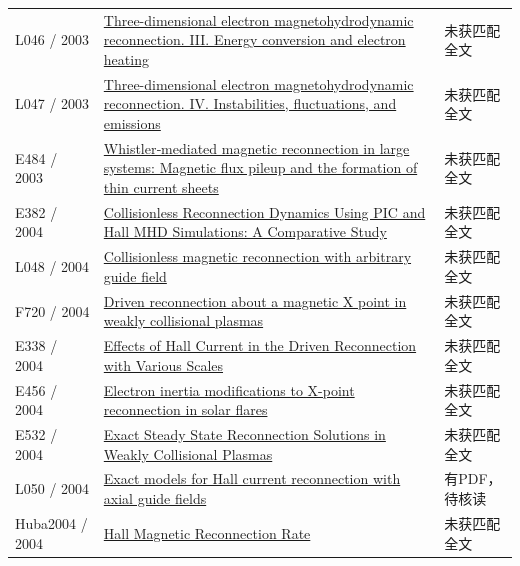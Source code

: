 \begin{longtable}{P{24mm}P{97mm}P{27mm}}
L046 / 2003 & \href{https://doi.org/10.1063/1.1579000}{Three-dimensional electron magnetohydrodynamic reconnection. III. Energy conversion and electron heating} & 未获匹配全文\\

L047 / 2003 & \href{https://doi.org/10.1063/1.1579001}{Three-dimensional electron magnetohydrodynamic reconnection. IV. Instabilities,  fluctuations,  and emissions} & 未获匹配全文\\

E484 / 2003 & \href{https://doi.org/10.1029/2001ja009180}{Whistler‐mediated magnetic reconnection in large systems: Magnetic flux pileup and the formation of thin current sheets} & 未获匹配全文\\

E382 / 2004 & \href{https://ui.adsabs.harvard.edu/abs/2004APS..DPPBP1073B/abstract}{Collisionless Reconnection Dynamics Using PIC and Hall MHD Simulations: A Comparative Study} & 未获匹配全文\\

L048 / 2004 & \href{https://doi.org/10.1063/1.1791640}{Collisionless magnetic reconnection with arbitrary guide field} & 未获匹配全文\\

F720 / 2004 & \href{https://doi.org/10.1063/1.1796691}{Driven reconnection about a magnetic X point in weakly collisional plasmas} & 未获匹配全文\\

E338 / 2004 & \href{https://doi.org/10.1088/0256-307x/21/7/059}{Effects of Hall Current in the Driven Reconnection with Various Scales} & 未获匹配全文\\

E456 / 2004 & \href{http://ui.adsabs.harvard.edu/abs/2004cosp...35.1242M/abstract}{Electron inertia modifications to X-point reconnection in solar flares} & 未获匹配全文\\

E532 / 2004 & \href{https://doi.org/10.1086/425646}{Exact Steady State Reconnection Solutions in Weakly Collisional Plasmas} & 未获匹配全文\\

L050 / 2004 & \href{https://doi.org/10.1063/1.1826094}{Exact models for Hall current reconnection with axial guide fields} & 有PDF，待核读\\

Huba2004 / 2004 & \href{https://doi.org/10.1103/physrevlett.93.175003}{Hall Magnetic Reconnection Rate} & 未获匹配全文\\


\end{longtable}
